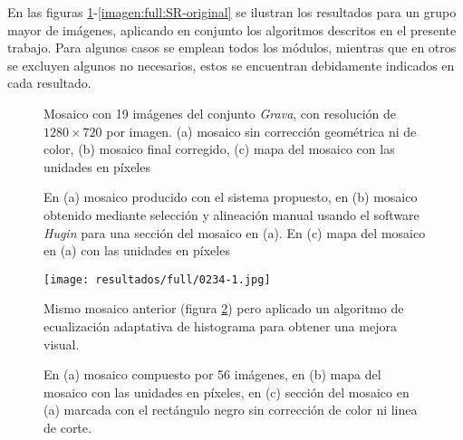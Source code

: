 En las figuras \ref{imagen:full:geo2}-\ref{imagen:full:SR-original} se ilustran los resultados para un grupo mayor de imágenes, aplicando en conjunto los algoritmos descritos en el presente trabajo. Para algunos casos se emplean todos los módulos, mientras que en otros se excluyen algunos no necesarios, estos se encuentran debidamente indicados en cada resultado.

\begin{figure}[H]
	\centering     %
		
	\caption[Mosaico del conjunto \textit{Grava}]{Mosaico con 19 imágenes del conjunto \textit{Grava}, con resolución de $1280\times 720$ por imagen. (a) mosaico sin corrección geométrica ni de color, (b) mosaico final corregido, (c) mapa del mosaico con las unidades en píxeles}
	\label{imagen:full:geo2}
\end{figure}

\begin{figure}[H]
	\centering     %
	
	\caption[Mosaico del conjunto \textit{Chuspa}]{En (a) mosaico producido con el sistema propuesto, en (b) mosaico obtenido mediante selección y alineación manual usando el software \textit{Hugin} para una sección del mosaico en (a). En (c) mapa del mosaico en (a) con las unidades en píxeles}
	\label{imagen:full:0234-map}
\end{figure}

\begin{figure}[H]
	\centering
	\texttt{[image: resultados/full/0234-1.jpg]}
	\caption[Mosaico mejorado visualmente del conjunto \textit{Chuspa}]{Mismo mosaico anterior (figura \ref{imagen:full:0234-map}) pero aplicado un algoritmo de ecualización adaptativa de histograma para obtener una mejora visual.}
	\label{imagen:full:0234-1}
\end{figure}

\begin{figure}[H]
	\centering     %
	
	\caption[Mosaico del conjunto \textit{ScottReef 25}]{En (a) mosaico compuesto por 56 imágenes, en (b) mapa del mosaico con las unidades en píxeles, en (c) sección del mosaico en (a) marcada con el rectángulo negro sin corrección de color ni linea de corte.}
	\label{imagen:full:SR}
\end{figure}


